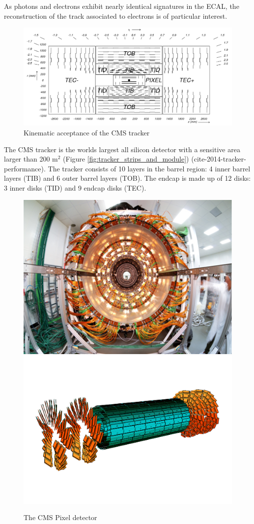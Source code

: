 {As photons and electrons exhibit nearly identical signatures in the ECAL, the reconstruction of the
track associated to electrons is of particular interest.

\begin{figure}
\begin{center}
\includegraphics[width=.95\textwidth]{pics/tracker_diagram}
\end{center}
\caption{Kinematic acceptance of the CMS tracker}
\label{fig:tracker_diagram}
\end{figure}

The CMS tracker is the worlds largest all silicon detector with a
 sensitive area larger than 200 m$^{2}$ (Figure \ref{fig:tracker_strips_and_module}) (cite-2014-tracker-performance). 
The tracker consists of 10 layers
in the barrel region: 4 inner barrel layers (TIB) and 6 outer barrel layers (TOB). The endcap is made up of 
12 disks: 3 inner disks (TID) and 9 endcap disks (TEC). 


\begin{figure}
\begin{center}
\includegraphics[width=.45\textwidth]{pics/naked_pixel}
\includegraphics[width=.45\textwidth]{pics/pixel_diagram}
\end{center}
\caption{The CMS Pixel detector }
\label{fig:pixel}
\end{figure}

}
